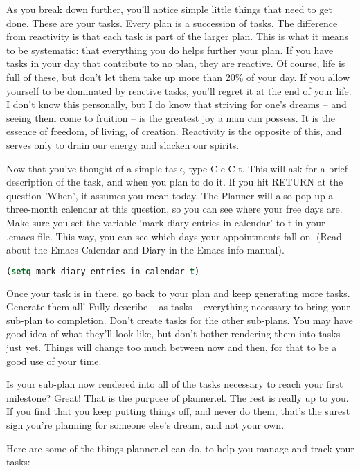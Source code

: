 \documentclass[12pt,a4paper,onecolumn]{article}
\begin{document}
\begin{sffamily}
As you break down further, you'll notice simple little things that need to get done. These are your
tasks. Every plan is a succession of tasks. The difference from reactivity is that each task is part
of the larger plan. This is what it means to be systematic: that everything you do helps further
your plan. If you have tasks in your day that contribute to no plan, they are reactive. Of course,
life is full of these, but don't let them take up more than 20\% of your day. If you allow yourself
to be dominated by reactive tasks, you'll regret it at the end of your life. I don't know this
personally, but I do know that striving for one's dreams -- and seeing them come to fruition -- is
the greatest joy a man can possess. It is the essence of freedom, of living, of creation. Reactivity
is the opposite of this, and serves only to drain our energy and slacken our spirits.

Now that you've thought of a simple task, type C-c C-t. This will ask for a brief description of the
task, and when you plan to do it. If you hit RETURN at the question 'When', it assumes you mean
today. The Planner will also pop up a three-month calendar at this question, so you can see where
your free days are. Make sure you set the variable `mark-diary-entries-in-calendar' to t in your
.emacs file. This way, you can see which days your appointments fall on. (Read about the Emacs
Calendar and Diary in the Emacs info manual).

\begin{lstlisting}[language=Lisp,morekeywords={setq,t}] (setq mark-diary-entries-in-calendar t)
\end{lstlisting}

Once your task is in there, go back to your plan and keep generating more tasks. Generate them all!
Fully describe -- as tasks -- everything necessary to bring your sub-plan to completion. Don't
create tasks for the other sub-plans. You may have good idea of what they'll look like, but don't
bother rendering them into tasks just yet. Things will change too much between now and then, for
that to be a good use of your time.

Is your sub-plan now rendered into all of the tasks necessary to reach your first milestone? Great!
That is the purpose of planner.el. The rest is really up to you. If you find that you keep putting
things off, and never do them, that's the surest sign you're planning for someone else's dream, and
not your own.

Here are some of the things planner.el can do, to help you manage and track your tasks:


\end{sffamily}
\end{document}
